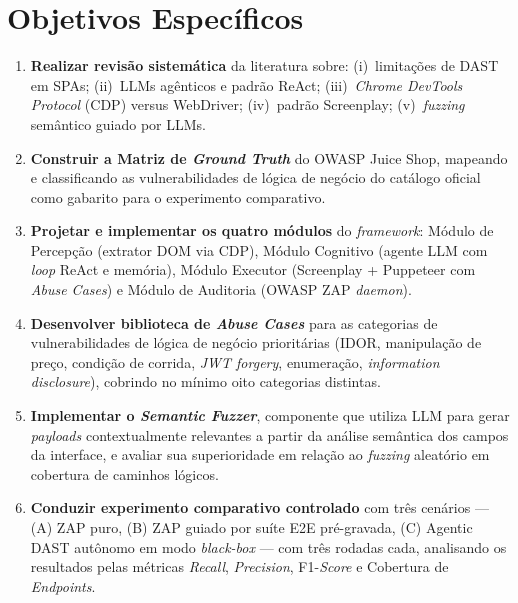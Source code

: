 \documentclass[
    12pt,
    openany,
    oneside,
    a4paper,
    brazil
]{abntex2}
\begin{document}
\section{Objetivos Específicos}

\begin{enumerate}
  \item \textbf{Realizar revisão sistemática} da literatura sobre:
  (i)~limitações de DAST em SPAs; (ii)~LLMs agênticos e padrão ReAct;
  (iii)~\textit{Chrome DevTools Protocol} (CDP) versus WebDriver;
  (iv)~padrão Screenplay; (v)~\textit{fuzzing} semântico guiado por
  LLMs.

  \item \textbf{Construir a Matriz de \textit{Ground Truth}} do OWASP
  Juice Shop, mapeando e classificando as vulnerabilidades de lógica de
  negócio do catálogo oficial como gabarito para o experimento
  comparativo.

  \item \textbf{Projetar e implementar os quatro módulos} do
  \textit{framework}: Módulo de Percepção (extrator DOM via CDP),
  Módulo Cognitivo (agente LLM com \textit{loop} ReAct e memória),
  Módulo Executor (Screenplay + Puppeteer com \textit{Abuse Cases}) e
  Módulo de Auditoria (OWASP ZAP \textit{daemon}).

  \item \textbf{Desenvolver biblioteca de \textit{Abuse Cases}} para as
  categorias de vulnerabilidades de lógica de negócio prioritárias
  (IDOR, manipulação de preço, condição de corrida, \textit{JWT
  forgery}, enumeração, \textit{information disclosure}), cobrindo no
  mínimo oito categorias distintas.

  \item \textbf{Implementar o \textit{Semantic Fuzzer}}, componente que
  utiliza LLM para gerar \textit{payloads} contextualmente relevantes
  a partir da análise semântica dos campos da interface, e avaliar sua
  superioridade em relação ao \textit{fuzzing} aleatório em cobertura
  de caminhos lógicos.

  \item \textbf{Conduzir experimento comparativo controlado} com três
  cenários --- (A) ZAP puro, (B) ZAP guiado por suíte E2E pré-gravada,
  (C) Agentic DAST autônomo em modo \textit{black-box} --- com três
  rodadas cada, analisando os resultados pelas métricas
  \textit{Recall}, \textit{Precision}, F1-\textit{Score} e Cobertura
  de \textit{Endpoints}.
\end{enumerate}
\end{document}

